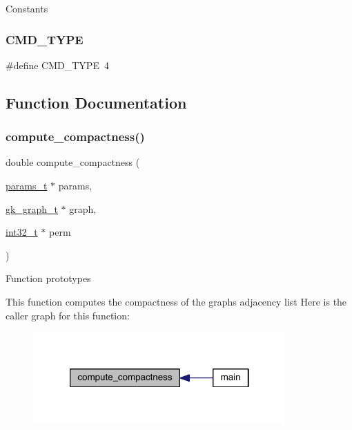 Constants \mbox{\label{a00149_a191373ee6717f2d688081e5f814778dd}} 
\subsubsection{\texorpdfstring{C\+M\+D\+\_\+\+T\+Y\+PE}{CMD\_TYPE}}
{\footnotesize\ttfamily \#define C\+M\+D\+\_\+\+T\+Y\+PE~4}



\subsection{Function Documentation}
\mbox{\label{a00149_aaa05369855e182bb76940a4c0e3898d8}} 
\subsubsection{\texorpdfstring{compute\+\_\+compactness()}{compute\_compactness()}}
{\footnotesize\ttfamily double compute\+\_\+compactness (\begin{DoxyParamCaption}\item[{\hyperlink{a00706}{params\+\_\+t} $\ast$}]{params,  }\item[{\hyperlink{a00638}{gk\+\_\+graph\+\_\+t} $\ast$}]{graph,  }\item[{\hyperlink{a00119_a37994e3b11c72957c6f454c6ec96d43d}{int32\+\_\+t} $\ast$}]{perm }\end{DoxyParamCaption})}

Function prototypes

This function computes the compactness of the graph\textquotesingle{}s adjacency list Here is the caller graph for this function\+:\nopagebreak
\begin{figure}[H]
\begin{center}
\leavevmode
\includegraphics[width=274pt]{a00149_aaa05369855e182bb76940a4c0e3898d8_icgraph}
\end{center}
\end{figure}
\mbox{\label{a00149_a0ddf1224851353fc92bfbff6f499fa97}} 
